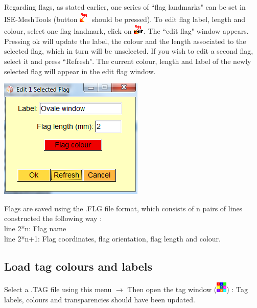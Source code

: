 \noindent
\begin{minipage}{0.55\textwidth}
Regarding flags, as stated earlier, one series of ``flag landmarks" can be set in ISE-MeshTools (button \includegraphics[scale=0.7]{images/pixmap/Flag01.png} should
be pressed). To edit flag label, length and colour, select one
flag landmark, click on \includegraphics[scale=0.7]{images/pixmap/Flag02.png}. The ``edit flag" window appears.
Pressing ok will update the label, the colour and the
length associated to the selected flag, which in turn will be
unselected. If you wish to edit a second flag, select it and press ``Refresh". The current colour, length
and label of the newly selected flag will appear in the edit flag window.
\end{minipage}  
 \begin{minipage}{0.45\textwidth}\centering
  \includegraphics[scale=0.5]{images/Flags/Edit1flag.png}
 \end{minipage} 
\noindent
Flags are saved using the .FLG file format, which consists of n pairs of lines constructed the following way :\\
line 2*n: Flag name\\
line 2*n+1: Flag coordinates, flag orientation, flag length and colour.

\subsection{Load tag colours and labels}
Select a .TAG file using this menu $\rightarrow$ Then open the tag window (\includegraphics[scale=0.7]{images/pixmap/Show_Tag_Window2.png}) : Tag labels, colours and
transparencies should have been updated.
